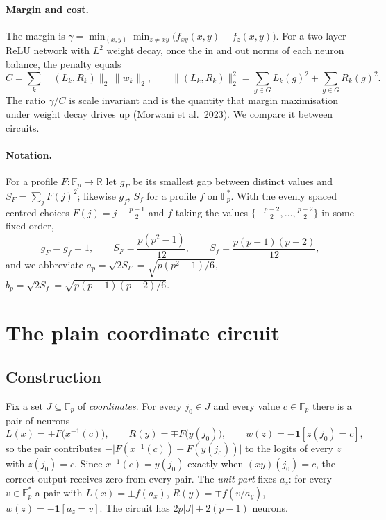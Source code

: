 \documentclass[11pt]{article}
\theoremstyle{remark}
\newcommand{\F}{\mathbb{F}}
\newcommand{\R}{\mathbb{R}}
\newcommand{\cost}{C}
\newcommand{\gam}{\gamma}
\newcommand{\abs}[1]{\lvert #1 \rvert}
\newcommand{\norm}[1]{\lVert #1 \rVert}
\newcommand{\ind}[1]{\mathbf{1}[#1]}
\begin{document}
\paragraph{Margin and cost.} The margin is $\gam = \min_{(x,y)} \min_{z \ne xy} \bigl(f_{xy}(x,y) - f_z(x,y)\bigr)$. For a two-layer
ReLU network with $L^2$ weight decay, once the in and out norms of each neuron balance, the penalty equals
\[
\cost = \sum_k \norm{(L_k, R_k)}_2 \, \norm{w_k}_2, \qquad \norm{(L_k,R_k)}_2^2 = \sum_{g \in G} L_k(g)^2 + \sum_{g \in G} R_k(g)^2 .
\]
The ratio $\gam/\cost$ is scale invariant and is the quantity that margin maximisation under weight decay drives up
(Morwani et al.\ 2023). We compare it between circuits.

\paragraph{Notation.} For a profile $F : \F_p \to \R$ let $g_F$ be its smallest gap between distinct values and
$S_F = \sum_j F(j)^2$; likewise $g_f$, $S_f$ for a profile $f$ on $\F_p^{*}$. With the evenly spaced centred choices
$F(j) = j - \tfrac{p-1}{2}$ and $f$ taking the values $\{-\tfrac{p-2}{2}, \dots, \tfrac{p-2}{2}\}$ in some fixed order,
\[
g_F = g_f = 1, \qquad S_F = \frac{p(p^2-1)}{12}, \qquad S_f = \frac{p(p-1)(p-2)}{12},
\]
and we abbreviate $a_p = \sqrt{2 S_F} = \sqrt{p(p^2-1)/6}$, $b_p = \sqrt{2 S_f} = \sqrt{p(p-1)(p-2)/6}$.

\section{The plain coordinate circuit}

\subsection{Construction}

Fix a set $J \subseteq \F_p$ of \emph{coordinates}. For every $j_0 \in J$ and every value $c \in \F_p$ there is a pair of neurons
\[
L(x) = \pm F\bigl(x^{-1}(c)\bigr), \qquad R(y) = \mp F\bigl(y(j_0)\bigr), \qquad w(z) = -\ind{z(j_0) = c},
\]
so the pair contributes $-\abs{F(x^{-1}(c)) - F(y(j_0))}$ to the logits of every $z$ with $z(j_0) = c$. Since $x^{-1}(c) = y(j_0)$
exactly when $(xy)(j_0) = c$, the correct output receives zero from every pair. The \emph{unit part} fixes $a_z$: for every
$v \in \F_p^{*}$ a pair with $L(x) = \pm f(a_x)$, $R(y) = \mp f(v / a_y)$, $w(z) = -\ind{a_z = v}$. The circuit has $2p\abs{J} + 2(p-1)$
neurons.
\end{document}
